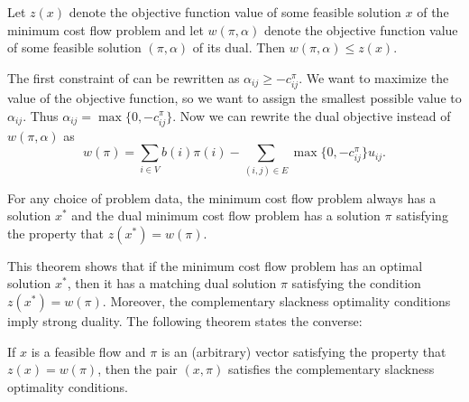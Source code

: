 \begin{theorem}
\label{weak_dual}
    Let $z(x)$ denote the objective function value of some feasible solution $x$ of the minimum cost flow problem and let $w(\pi, \alpha)$ denote the objective function value of some feasible solution $(\pi, \alpha)$ of its dual. Then $w(\pi, \alpha) \leq z(x)$.
\end{theorem}

The first constraint of  can be rewritten as $\alpha_{ij} \geq -c^\pi_{ij}$. We want to maximize the value of the objective function, so we want to assign the smallest possible value to $\alpha_{ij}$. Thus $\alpha_{ij} = \max\{0, -c^\pi_{ij}\}$. Now we can rewrite the dual objective instead of $w(\pi, \alpha)$ as 
\[
w(\pi) = \sum_{i \in V} b(i)\pi(i) - \sum_{(i,j)\in E} \max\{0, -c^\pi_{ij}\}u_{ij}.
\]

\begin{theorem}
\label{strong_dual}
For any choice of problem data, the minimum cost flow problem always has a solution $x^*$ and the dual minimum cost flow problem has a solution $\pi$ satisfying the property that $z(x^*) = w(\pi)$.
\end{theorem}

This theorem shows that if the minimum cost flow problem has an optimal solution $x^*$, then it has a matching dual solution $\pi$ satisfying the condition $z(x^*) = w(\pi)$. Moreover, the complementary slackness optimality conditions imply strong duality. The following theorem states the converse:

\begin{theorem}
    If $x$ is a feasible flow and $\pi$ is an (arbitrary) vector satisfying the property that $z(x) = w(\pi)$, then the pair $(x, \pi)$ satisfies the complementary slackness optimality conditions.
\end{theorem}